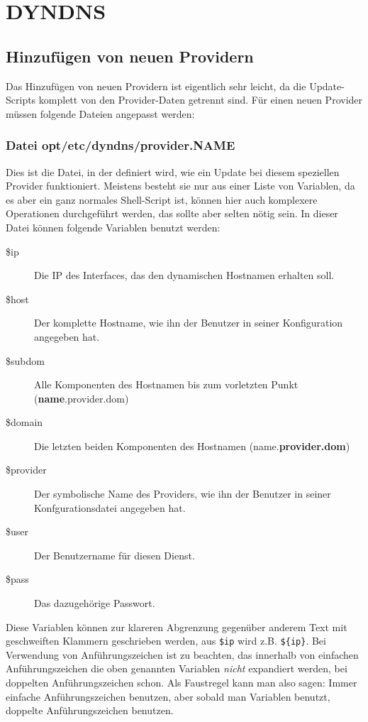 \section{DYNDNS}
\subsection{Hinzufügen von neuen Providern}

Das Hinzufügen von neuen Providern ist eigentlich sehr leicht, da die
Update-Scripts komplett von den Provider-Daten getrennt sind. Für einen neuen
Provider müssen folgende Dateien angepasst werden:

\subsubsection{Datei opt/etc/dyndns/provider.NAME}

Dies ist die Datei, in der definiert wird, wie ein Update bei diesem
speziellen Provider funktioniert. Meistens besteht sie nur aus einer Liste
von Variablen, da es aber ein ganz normales Shell-Script ist, können hier
auch komplexere Operationen durchgeführt werden, das sollte aber selten
nötig sein. In dieser Datei können folgende Variablen benutzt werden:

\begin{description}
\item[\$ip] Die IP des Interfaces, das den dynamischen Hostnamen erhalten
	soll.
\item[\$host] Der komplette Hostname, wie ihn der Benutzer in seiner
	Konfiguration angegeben hat.
\item[\$subdom] Alle Komponenten des Hostnamen bis zum vorletzten Punkt
	(\textbf{name}.provider.dom)
\item[\$domain] Die letzten beiden Komponenten des Hostnamen
	(name.\textbf{provider.dom})
\item[\$provider] Der symbolische Name des Providers, wie ihn der Benutzer
	in seiner Konfgurationsdatei angegeben hat.
\item[\$user] Der Benutzername für diesen Dienst.
\item[\$pass] Das dazugehörige Passwort.
\end{description}

Diese Variablen können zur klareren Abgrenzung gegenüber anderem Text mit
geschweiften Klammern geschrieben werden, aus \texttt{\$ip} wird z.B. \texttt{\$\{ip\}}.
Bei Verwendung von Anführungszeichen ist zu beachten, das
innerhalb von einfachen Anführungszeichen die oben genannten Variablen
\emph{nicht} expandiert werden, bei doppelten Anführungszeichen schon.
Als Faustregel kann man also sagen: Immer einfache Anführungszeichen
benutzen, aber sobald man Variablen benutzt, doppelte Anführungszeichen
benutzen.

